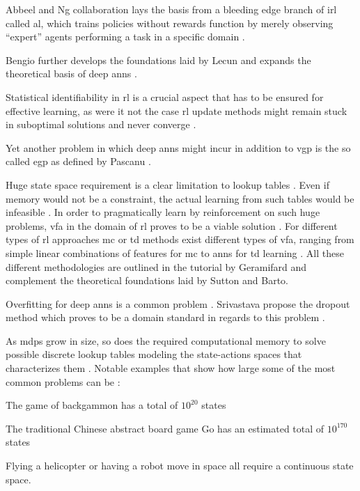 \documentclass{seal_thesis}
\begin{document}
Abbeel and Ng collaboration lays the basis from a bleeding edge branch of \gls{irl} called \gls{al}, which trains policies without rewards function by merely observing ``expert'' agents performing a task in a specific domain \cite{Abbeel2004}.

Bengio further develops the foundations laid by Lecun and expands the theoretical basis of deep \glspl{ann} \cite{Bengio2009}.

Statistical identifiability in \gls{rl} is a crucial aspect that has to be ensured for effective learning, as were it not the case \gls{rl} update methods might remain stuck in suboptimal solutions and never converge \cite{Zhang2011}.

Yet another problem in which deep \glspl{ann} might incur in addition to \gls{vgp} is the so called \gls{egp} as defined by Pascanu \etal \cite{Pascanu2012}.

Huge state space requirement is a clear limitation to lookup tables \cite{Sutton2017}. Even if memory would not be a constraint, the actual learning from such tables would be infeasible \cite{Sutton2017}. In order to pragmatically learn by reinforcement on such huge problems, \gls{vfa} in the domain of \gls{rl} proves to be a viable solution \cite{Sutton2017}. For different types of \gls{rl} approaches \ie \gls{mc} or \gls{td} methods exist different types of \gls{vfa}, ranging from simple linear combinations of features for \gls{mc} to \glspl{ann} for \gls{td} learning \cite{Sutton2017}. All these different methodologies are outlined in the tutorial by Geramifard \etal \cite{Geramifard2013} and complement the theoretical foundations laid by Sutton and Barto.

Overfitting for deep \glspl{ann} is a common problem \cite[p. 218]{Sutton2017}. Srivastava \etal propose the dropout method which proves to be a domain standard in regards to this problem \cite{Srivastava2014}.

As \glspl{mdp} grow in size, so does the required computational memory to solve possible discrete lookup tables modeling the state-actions spaces that characterizes them \cite{Sutton2017}. Notable examples that show how large some of the most common problems can be \cite{Sutton2017}:
\begin{enumerate*}
	\item The game of backgammon has a total of $10^{20}$ states
	\item The traditional Chinese abstract board game Go has an estimated total of $10^{170}$ states
	\item Flying a helicopter or having a robot move in space all require a continuous state space.
\end{enumerate*}
\end{document}

